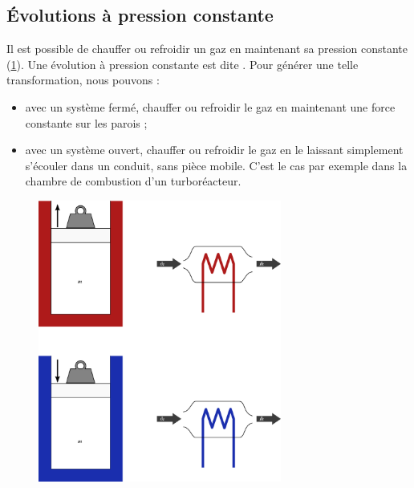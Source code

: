 	\subsection{Évolutions à pression constante}
	\label{ch_gp_isobares}

		Il est possible de chauffer ou refroidir un gaz en maintenant sa pression constante (\cref{fig_gp_pression_constante}). Une évolution à pression constante est dite . Pour générer une telle transformation, nous pouvons :
		
		\begin{itemize}
			\item avec un système fermé, chauffer ou refroidir le gaz en maintenant une force constante sur les parois ;
			\item avec un système ouvert, chauffer ou refroidir le gaz en le laissant simplement s’écouler dans un conduit, sans pièce mobile. C’est le cas par exemple dans la chambre de combustion d’un turboréacteur.
		\end{itemize}

		\begin{figure}
			\begin{center}
				\includegraphics[width=8cm]{images/pression_constante.png}
			\end{center}
			\label{fig_gp_pression_constante}
		\end{figure}
		
